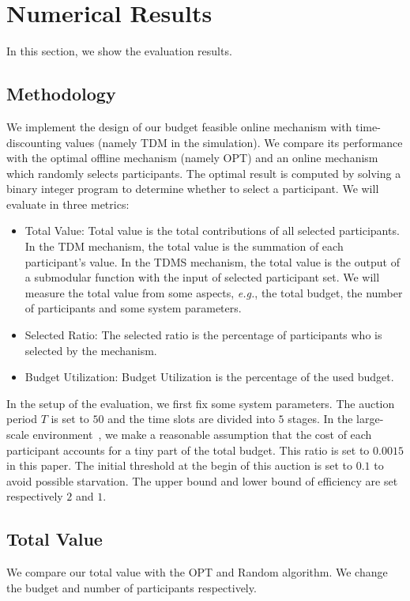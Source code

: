 \documentclass[10pt,journal,letterpaper,compsoc]{IEEEtran}
\newcommand{\eg}{{\em e.g.}}
\begin{document}
\section{Numerical Results}
In this section, we show the evaluation results.
\subsection{Methodology}
We implement the design of our budget feasible online mechanism with time-discounting values (namely TDM in the simulation). We compare its performance with the optimal offline mechanism (namely OPT) and an online mechanism which randomly selects participants. The optimal result is computed by solving a binary integer program to determine whether to select a participant. We will evaluate in three metrics:
\begin{itemize}
\item Total Value: Total value is the total contributions of all selected participants. In the TDM mechanism, the total value is the summation of each participant's value. In the TDMS mechanism, the total value is the output of a submodular function with the input of selected participant set. We will measure the total value from some aspects, \eg, the total budget, the number of participants and some system parameters.

\item Selected Ratio: The selected ratio is the percentage of participants who is selected by the mechanism.

\item Budget Utilization: Budget Utilization is the percentage of the used budget.
\end{itemize}
In the setup of the evaluation, we first fix some system parameters. The auction period $T$ is set to $50$ and the time slots are divided into $5$ stages. In the large-scale environment~\cite{6979011}, we make a reasonable assumption that the cost of each participant accounts for a tiny part of the total budget. This ratio  is set to $0.0015$ in this paper. The initial threshold at the begin of this auction is set to $0.1$ to avoid possible starvation. The upper bound and lower bound of efficiency are set respectively $2$ and $1$.
\subsection{Total Value}
We compare our total value with the OPT and Random algorithm. We change the budget and number of participants respectively.
\end{document}
